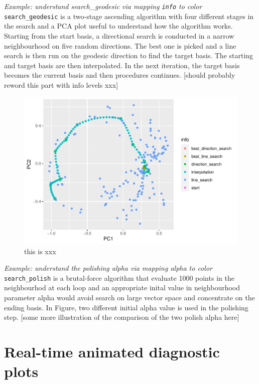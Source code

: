 \documentclass[12pt]{article}
\begin{document}
\emph{Example: understand search\_geodesic via mapping \texttt{info} to
color} \texttt{search\_geodesic} is a two-stage ascending algorithm with
four different stages in the search and a PCA plot useful to understand
how the algorithm works. Starting from the start basis, a directional
search is conducted in a narrow neighbourhood on five random directions.
The best one is picked and a line search is then run on the geodesic
direction to find the target basis. The starting and target basis are
then interpolated. In the next iteration, the target basis becomes the
current basis and then procedures continues. {[}should probably reword
this part with info levels xxx{]}

\begin{figure}
\centering
\includegraphics{paper_files/figure-latex/pca-1.pdf}
\caption{\label{pca}this is xxx}
\end{figure}

\emph{Example: understand the polishing alpha via mapping alpha to
color} \texttt{search\_polish} is a brutal-force algorithm that evaluate
1000 points in the neighbourhod at each loop and an appropriate inital
value in neighbourhood parameter alpha would avoid search on large
vector space and concentrate on the ending basis. In Figure, two
different initial alpha value is used in the polishing step. {[}some
more illustration of the comparison of the two polish alpha here{]}

\hypertarget{real-time-animated-diagnostic-plots}{%
\section{Real-time animated diagnostic
plots}\label{real-time-animated-diagnostic-plots}}
\end{document}

